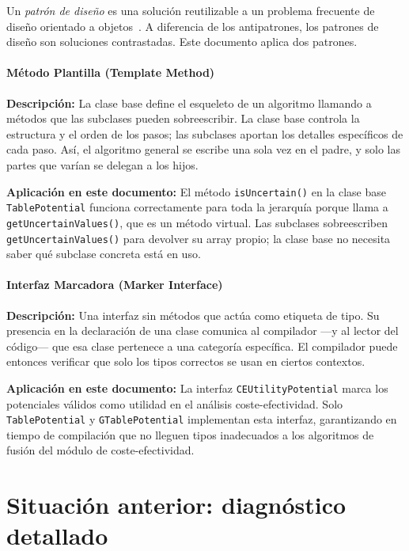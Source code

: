\documentclass[11pt,a4paper]{article}
\newcommand{\code}[1]{\texttt{#1}}
\begin{document}
Un \emph{patrón de diseño} es una solución reutilizable a un problema
frecuente de diseño orientado a objetos~\cite{gamma1995}.  A diferencia de los
antipatrones, los patrones de diseño son soluciones contrastadas.  Este
documento aplica dos patrones.

\label{sec:fund-template-method}
\paragraph{Método Plantilla (Template Method)}

\textbf{Descripción:} La clase base define el esqueleto de un algoritmo
llamando a métodos que las subclases pueden sobreescribir.  La clase base
controla la estructura y el orden de los pasos; las subclases aportan los
detalles específicos de cada paso.  Así, el algoritmo general se escribe
una sola vez en el padre, y solo las partes que varían se delegan a los hijos.

\textbf{Aplicación en este documento:} El método \code{isUncertain()} en la
clase base \code{TablePotential} funciona correctamente para toda la jerarquía
porque llama a \code{getUncertainValues()}, que es un método virtual.  Las
subclases sobreescriben \code{getUncertainValues()} para devolver su array
propio; la clase base no necesita saber qué subclase concreta está en uso.

\label{sec:fund-marker-interface}
\paragraph{Interfaz Marcadora (Marker Interface)}

\textbf{Descripción:} Una interfaz sin métodos que actúa como etiqueta de tipo.
Su presencia en la declaración de una clase comunica al compilador ---y al
lector del código--- que esa clase pertenece a una categoría específica.  El
compilador puede entonces verificar que solo los tipos correctos se usan en
ciertos contextos.

\textbf{Aplicación en este documento:} La interfaz \code{CEUtilityPotential}
marca los potenciales válidos como utilidad en el análisis coste-efectividad.
Solo \code{TablePotential} y \code{GTablePotential} implementan esta interfaz,
garantizando en tiempo de compilación que no lleguen tipos inadecuados a los
algoritmos de fusión del módulo de coste-efectividad.

\section{Situación anterior: diagnóstico detallado}
\end{document}
